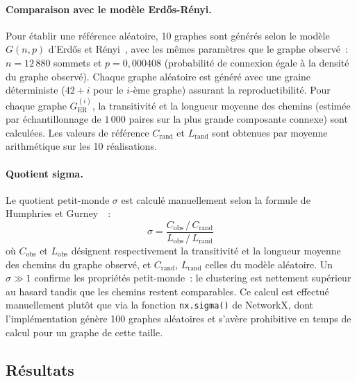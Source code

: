 \paragraph{Comparaison avec le mod\`ele Erd\H{o}s-R\'enyi.}
Pour \'etablir une r\'ef\'erence al\'eatoire, 10 graphes sont g\'en\'er\'es selon le mod\`ele $G(n, p)$ d'Erd\H{o}s et R\'enyi~\cite{erdos1959random}, avec les m\^emes param\`etres que le graphe observ\'e~: $n = 12\,880$ sommets et $p = 0{,}000408$ (probabilit\'e de connexion \'egale \`a la densit\'e du graphe observ\'e). Chaque graphe al\'eatoire est g\'en\'er\'e avec une graine d\'eterministe ($42 + i$ pour le $i$-\`eme graphe) assurant la reproductibilit\'e. Pour chaque graphe $G_{\text{ER}}^{(i)}$, la transitivit\'e et la longueur moyenne des chemins (estim\'ee par \'echantillonnage de $1\,000$ paires sur la plus grande composante connexe) sont calcul\'ees. Les valeurs de r\'ef\'erence $C_{\text{rand}}$ et $L_{\text{rand}}$ sont obtenues par moyenne arithm\'etique sur les 10 r\'ealisations.

\paragraph{Quotient sigma.}
Le quotient petit-monde $\sigma$ est calcul\'e manuellement selon la formule de Humphries et Gurney~\cite{humphries2008smallworld}~:
\begin{equation}
\sigma = \frac{C_{\text{obs}} \,/\, C_{\text{rand}}}{L_{\text{obs}} \,/\, L_{\text{rand}}}
\label{eq:sigma}
\end{equation}
o\`u $C_{\text{obs}}$ et $L_{\text{obs}}$ d\'esignent respectivement la transitivit\'e et la longueur moyenne des chemins du graphe observ\'e, et $C_{\text{rand}}$, $L_{\text{rand}}$ celles du mod\`ele al\'eatoire. Un $\sigma \gg 1$ confirme les propri\'et\'es petit-monde~: le clustering est nettement sup\'erieur au hasard tandis que les chemins restent comparables. Ce calcul est effectu\'e manuellement plut\^ot que via la fonction \texttt{nx.sigma()} de NetworkX, dont l'impl\'ementation g\'en\`ere 100 graphes al\'eatoires et s'av\`ere prohibitive en temps de calcul pour un graphe de cette taille.

\subsection{R\'esultats}
\label{sec:rq5_resultats}

